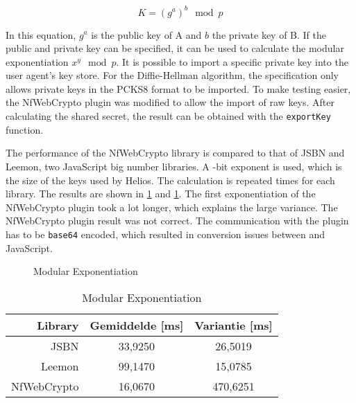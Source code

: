 \begin{equation}
  \label{eq:wc:diffie_hellman}
  K = (g^a)^b \mod{p}
\end{equation}

\par In this equation, $g^a$ is the public key of A and $b$ the private key of B. If the public and private key can be specified, it can be used to calculate the modular exponentiation $x^y \mod{p}$. It is possible to import a specific private key into the user agent's key store. For the Diffie-Hellman algorithm, the specification only allows private keys in the PCKS8 format to be imported. To make testing easier, the NfWebCrypto plugin was modified to allow the import of raw keys. After calculating the shared secret, the result can be obtained with the \texttt{exportKey} function.

\par The performance of the NfWebCrypto library is compared to that of JSBN and Leemon, two JavaScript big number libraries.\cite{site:wu_rsa_and_ecc_in_javascript}\cite{site:baird_big_integers_in_javascript} A -bit exponent is used, which is the size of the keys used by Helios. The calculation is repeated  times for each library. The results are shown in \ref{fig:wc:modular_exponentiation} and \ref{tab:wc:modular_exponentiation}. The first exponentiation of the NfWebCrypto plugin took a lot longer, which explains the large variance. The NfWebCrypto plugin result was not correct. The communication with the plugin has to be \texttt{base64} encoded, which resulted in conversion issues between \cplusplus and JavaScript.

\begin{figure}
  \caption{Modular Exponentiation}
  \label{fig:wc:modular_exponentiation}
\end{figure}

\begin{table}
  \begin{center}
    \caption{Modular Exponentiation}
    \label{tab:wc:modular_exponentiation}
    \begin{tabular}{r | c c}
      Library & Gemiddelde [ms] & Variantie [ms] \\ \hline
      JSBN & 33,9250 & 26,5019  \\
      Leemon & 99,1470 & 15,0785 \\
      NfWebCrypto & 16,0670 & 470,6251
    \end{tabular}
  \end{center}
\end{table}

